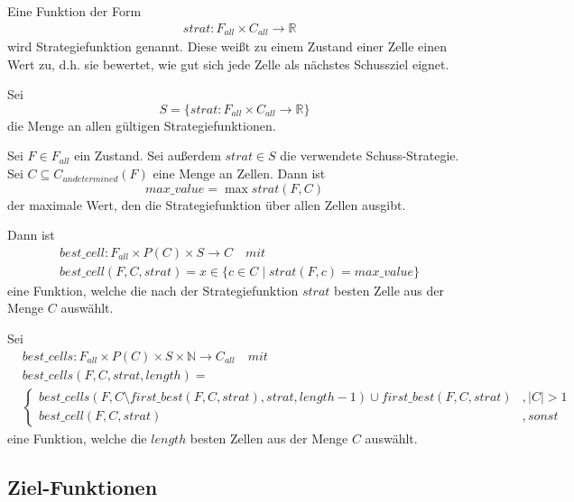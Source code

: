 \documentclass[a4paper,12pt]{llncs}
\numberwithin{equation}{section}
\begin{document}
\begin{definition}
Eine Funktion der Form
\begin{align}
&strat:F_{all} \times C_{all} \rightarrow \mathbb{R} \nonumber
\end{align}
wird Strategiefunktion genannt. Diese weißt zu einem Zustand einer Zelle einen Wert zu, d.h. sie bewertet, wie gut sich jede Zelle als nächstes Schussziel eignet.
\end{definition}

\begin{definition}
Sei
\[
S=\{ strat:F_{all} \times C_{all} \rightarrow \mathbb{R} \}
\]
die Menge an allen gültigen Strategiefunktionen.
\end{definition}

\begin{definition}
Sei $F\in F_{all}$ ein Zustand.
Sei außerdem $strat \in S$ die verwendete Schuss-Strategie.
Sei $C \subseteq C_{undetermined}(F)$ eine Menge an Zellen.
Dann ist
\[
max\_value=\max strat(F, C)
\]
der maximale Wert, den die Strategiefunktion über allen Zellen ausgibt.

Dann ist
\begin{align}
&best\_cell:F_{all} \times P(C) \times S \rightarrow C \quad mit \nonumber\\
&best\_cell(F, C, strat)=x \in \{c \in C \mid strat(F, c) = max\_value\}
\nonumber
\end{align}
eine Funktion, welche die nach der Strategiefunktion $strat$ besten Zelle aus der Menge $C$ auswählt.
\end{definition}

\begin{definition}
Sei
\begin{align}
&best\_cells:F_{all} \times P(C) \times S \times \mathbb{N} \rightarrow C_{all} \quad mit \nonumber\\
&best\_cells(F, C, strat, length)=\\
&\begin{cases}
best\_cells(F, C \setminus first\_best(F, C, strat), strat, length-1) \cup first\_best(F, C, strat)&, |C| > 1 \\
best\_cell(F, C, strat)&, sonst
\end{cases}
\nonumber
\end{align}
eine Funktion, welche die $length$ besten Zellen aus der Menge $C$ auswählt.
\end{definition}

\subsection{Ziel-Funktionen}
\end{document}
